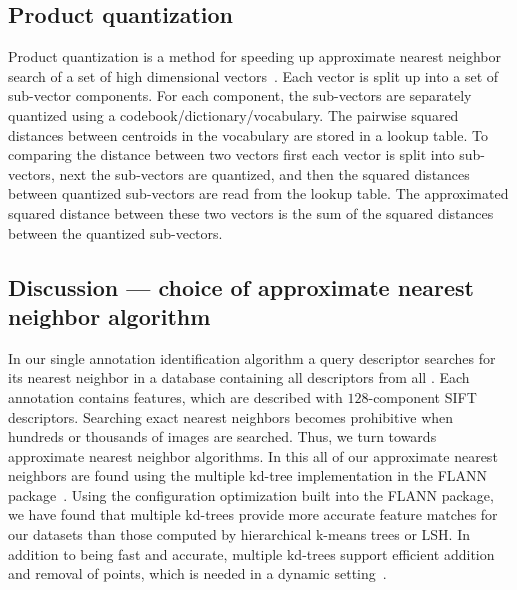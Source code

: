         \subsection{Product quantization}
            Product quantization is a method for speeding up approximate nearest neighbor search of a set of high
            dimensional vectors~\cite{jegou_product_2011,ge_optimized_2013}. Each vector is split up into a set of
            sub-vector components. For each component, the sub-vectors are separately quantized using a
            codebook/dictionary/vocabulary. The pairwise squared distances between centroids in the vocabulary are
            stored in a lookup table. To comparing the distance between two vectors first each vector is split into
            sub-vectors, next the sub-vectors are quantized, and then the squared distances between quantized
            sub-vectors are read from the lookup table. The approximated squared distance between these two vectors
            is the sum of the squared distances between the quantized sub-vectors.

        \subsection{Discussion --- choice of approximate nearest neighbor algorithm}
            In our single annotation identification algorithm a query descriptor searches for its nearest neighbor
            in a database containing all descriptors from all \exemplars{}. Each annotation contains
             features, which are described with $128$-component SIFT descriptors. Searching exact
            nearest neighbors becomes prohibitive when hundreds or thousands of images are searched. Thus, we turn
            towards approximate nearest neighbor algorithms. In this \thesis{} all of our approximate nearest
            neighbors are found using the multiple kd-tree implementation in the FLANN
            package~\cite{muja_fast_2009}. Using the configuration optimization built into the FLANN package, we
            have found that multiple kd-trees provide more accurate feature matches for our datasets than those
            computed by hierarchical k-means trees or LSH{}. In addition to being fast and accurate, multiple
            kd-trees support efficient addition and removal of points, which is needed in a dynamic
            setting~\cite{silpa_anan_optimised_2008}.
